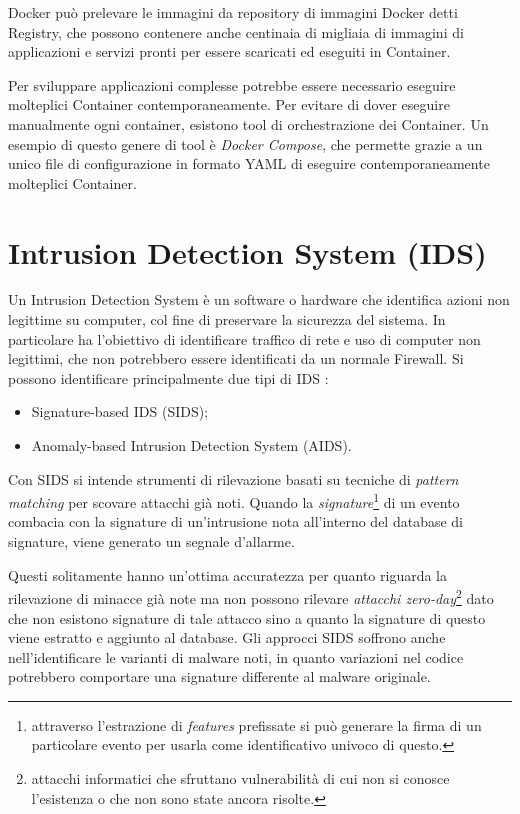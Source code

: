 Docker può prelevare le immagini da repository di immagini Docker detti Registry, che possono contenere anche centinaia di migliaia di immagini di applicazioni e servizi pronti per essere scaricati ed eseguiti in Container.

Per sviluppare applicazioni complesse  potrebbe essere necessario eseguire molteplici Container contemporaneamente. Per evitare di dover eseguire manualmente ogni container, esistono tool di orchestrazione dei Container. Un esempio di questo genere di tool è \textit{Docker Compose}, che permette grazie a un unico file di configurazione in formato YAML di eseguire contemporaneamente  molteplici Container.
\clearpage
\chapter{Intrusion Detection System (IDS)}
Un Intrusion Detection System è un software o hardware che identifica azioni non legittime su computer, col fine di preservare la sicurezza del sistema. In particolare ha l'obiettivo di identificare traffico di rete e uso di computer non legittimi, che non potrebbero essere identificati da un normale Firewall. Si possono identificare principalmente due tipi di IDS \cite{khraisat2019survey}:
\begin{itemize}
    \item Signature-based IDS (SIDS);
    \item Anomaly-based Intrusion Detection System (AIDS).
\end{itemize}

Con SIDS si intende strumenti di rilevazione basati su tecniche di \textit{pattern matching} per scovare attacchi già noti. Quando la \textit{signature}\footnote{attraverso l'estrazione di \textit{features} prefissate si può generare la firma  di un particolare evento per usarla come identificativo univoco di questo.} di un evento combacia con la signature di un'intrusione nota all'interno del database di signature, viene generato un segnale d'allarme.

Questi solitamente hanno un'ottima accuratezza per quanto riguarda la rilevazione di minacce già note ma non possono rilevare \textit{attacchi zero-day}\footnote{attacchi informatici che sfruttano vulnerabilità di cui non si conosce l'esistenza o che non sono state ancora risolte.} dato che non esistono signature di tale attacco sino a quanto la signature di questo viene estratto e aggiunto al database.
Gli approcci SIDS soffrono anche nell'identificare le varianti di malware noti, in quanto variazioni nel codice potrebbero comportare una signature differente al malware originale.

